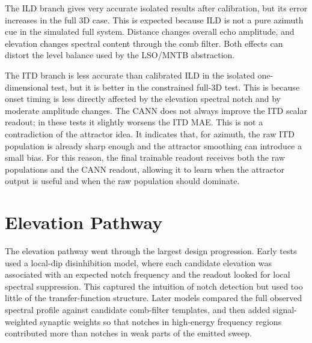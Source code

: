 The ILD branch gives very accurate isolated results after calibration, but its error increases in the full 3D case. This is expected because ILD is not a pure azimuth cue in the simulated full system. Distance changes overall echo amplitude, and elevation changes spectral content through the comb filter. Both effects can distort the level balance used by the LSO/MNTB abstraction.

The ITD branch is less accurate than calibrated ILD in the isolated one-dimensional test, but it is better in the constrained full-3D test. This is because onset timing is less directly affected by the elevation spectral notch and by moderate amplitude changes. The CANN does not always improve the ITD scalar readout; in these tests it slightly worsens the ITD MAE. This is not a contradiction of the attractor idea. It indicates that, for azimuth, the raw ITD population is already sharp enough and the attractor smoothing can introduce a small bias. For this reason, the final trainable readout receives both the raw populations and the CANN readout, allowing it to learn when the attractor output is useful and when the raw population should dominate.

\section{Elevation Pathway}

The elevation pathway went through the largest design progression. Early tests used a local-dip disinhibition model, where each candidate elevation was associated with an expected notch frequency and the readout looked for local spectral suppression. This captured the intuition of notch detection but used too little of the transfer-function structure. Later models compared the full observed spectral profile against candidate comb-filter templates, and then added signal-weighted synaptic weights so that notches in high-energy frequency regions contributed more than notches in weak parts of the emitted sweep.

